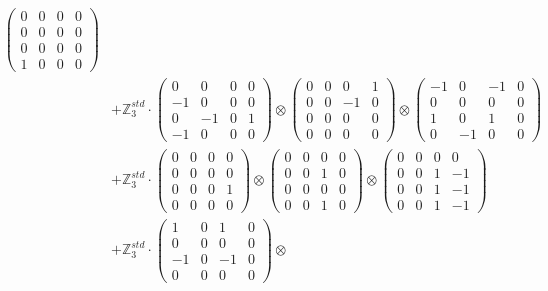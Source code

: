 \documentclass{article}
\begin{document}
{\begin{align}
            \begin{pmatrix} 0 & 0 & 0 & 0 \\ 0 & 0 & 0 & 0 \\ 0 & 0 & 0 & 0 \\ 1 & 0 & 0 & 0 \end{pmatrix} \\ 
        &+ \label{Rs16-Rc11-Solution-16-c25} \mathbb{Z}_3^{std} \cdot 
            \begin{pmatrix} 0 & 0 & 0 & 0 \\ -1 & 0 & 0 & 0 \\ 0 & -1 & 0 & 1 \\ -1 & 0 & 0 & 0 \end{pmatrix} \otimes 
            \begin{pmatrix} 0 & 0 & 0 & 1 \\ 0 & 0 & -1 & 0 \\ 0 & 0 & 0 & 0 \\ 0 & 0 & 0 & 0 \end{pmatrix} \otimes 
            \begin{pmatrix} -1 & 0 & -1 & 0 \\ 0 & 0 & 0 & 0 \\ 1 & 0 & 1 & 0 \\ 0 & -1 & 0 & 0 \end{pmatrix} \\ 
        &+ \label{Rs16-Rc11-Solution-16-c26} \mathbb{Z}_3^{std} \cdot 
            \begin{pmatrix} 0 & 0 & 0 & 0 \\ 0 & 0 & 0 & 0 \\ 0 & 0 & 0 & 1 \\ 0 & 0 & 0 & 0 \end{pmatrix} \otimes 
            \begin{pmatrix} 0 & 0 & 0 & 0 \\ 0 & 0 & 1 & 0 \\ 0 & 0 & 0 & 0 \\ 0 & 0 & 1 & 0 \end{pmatrix} \otimes 
            \begin{pmatrix} 0 & 0 & 0 & 0 \\ 0 & 0 & 1 & -1 \\ 0 & 0 & 1 & -1 \\ 0 & 0 & 1 & -1 \end{pmatrix} \\ 
        &+ \label{Rs16-Rc11-Solution-16-c27} \mathbb{Z}_3^{std} \cdot 
            \begin{pmatrix} 1 & 0 & 1 & 0 \\ 0 & 0 & 0 & 0 \\ -1 & 0 & -1 & 0 \\ 0 & 0 & 0 & 0 \end{pmatrix} \otimes 

\end{align}}
\end{document}
